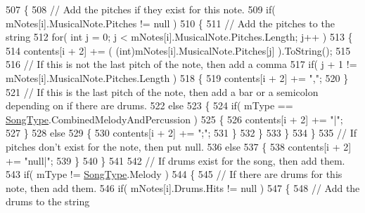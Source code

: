 \begin{DoxyCodeInclude}
507             \{
508                 \textcolor{comment}{// Add the pitches if they exist for this note.}
509                 \textcolor{keywordflow}{if}( mNotes[i].MusicalNote.Pitches != null )
510                 \{
511                     \textcolor{comment}{// Add the pitches to the string}
512                     \textcolor{keywordflow}{for}( \textcolor{keywordtype}{int} j = 0; j < mNotes[i].MusicalNote.Pitches.Length; j++ )
513                     \{
514                         contents[i + 2] += ( (int)mNotes[i].MusicalNote.Pitches[j] ).ToString();
515 
516                         \textcolor{comment}{// If this is not the last pitch of the note, then add a comma}
517                         \textcolor{keywordflow}{if}( j + 1 != mNotes[i].MusicalNote.Pitches.Length )
518                         \{
519                             contents[i + 2] += \textcolor{stringliteral}{","};
520                         \}
521                         \textcolor{comment}{// If this is the last pitch of the note, then add a bar or a semicolon depending
       on if there are drums.}
522                         \textcolor{keywordflow}{else}
523                         \{
524                             \textcolor{keywordflow}{if}( mType == \hyperlink{group___song_enums_gae681a1f001333e39fc1cb4fea97bfe1b}{SongType}.CombinedMelodyAndPercussion )
525                             \{
526                                 contents[i + 2] += \textcolor{stringliteral}{"|"};
527                             \}
528                             \textcolor{keywordflow}{else}
529                             \{
530                                 contents[i + 2] += \textcolor{stringliteral}{";"};
531                             \}
532                         \}
533                     \}
534                 \}
535                 \textcolor{comment}{// If pitches don't exist for the note, then put null.}
536                 \textcolor{keywordflow}{else}
537                 \{
538                     contents[i + 2] += \textcolor{stringliteral}{"null|"};
539                 \}
540             \}
541 
542             \textcolor{comment}{// If drums exist for the song, then add them.}
543             \textcolor{keywordflow}{if}( mType != \hyperlink{group___song_enums_gae681a1f001333e39fc1cb4fea97bfe1b}{SongType}.Melody )
544             \{
545                 \textcolor{comment}{// If there are drums for this note, then add them. }
546                 \textcolor{keywordflow}{if}( mNotes[i].Drums.Hits != null )
547                 \{
548                     \textcolor{comment}{// Add the drums to the string}

\end{DoxyCodeInclude}
